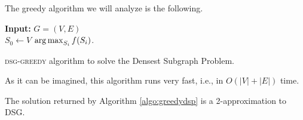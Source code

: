 The greedy algorithm we will analyze is the following.

\begin{algorithm}
	\textbf{Input: } $G=(V, E)$\\
	$S_0 \gets V$\;
	\Return  $\operatorname*{arg\,max}_{S_i} f(S_i)$.
	
	\caption{\textsc{dsg-greedy} algorithm to solve the Densest Subgraph Problem.}
	\label{algo:greedydsp}
\end{algorithm}

As it can be imagined, this algorithm runs very fast, i.e., in $O(|V| + |E|)$ time. 

\begin{thm}
	The solution returned by Algorithm \ref{algo:greedydsp} is a 2-approximation to DSG.
\end{thm}

